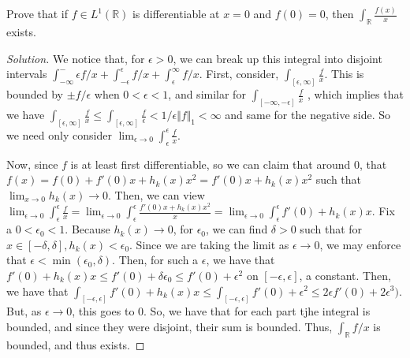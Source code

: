 \documentclass[10pt]{article}
\newenvironment{problem}[2][Problem]{\begin{trivlist}
\item[\hskip \labelsep {\bfseries #1}\hskip \labelsep {\bfseries #2.}]}{\end{trivlist}}
\begin{document}
\begin{problem}{4.4.19}
Prove that if $f \in L^1(\mathbb{R})$ is differentiable at $x = 0$ and $f(0) = 0$, then $\int_{\mathbb{R}} \frac{f(x)}{x}$ exists. 
\end{problem}
\begin{proof}[Solution]

We notice that, for $\epsilon > 0$, we can break up this integral into disjoint intervals $\int_{-\infty}^-\epsilon f/x + \int_{-\epsilon}^\epsilon f/x + \int_\epsilon^\infty f/x$. First, consider, $\int_{[\epsilon,\infty]} \frac{f}{x}$. This is bounded by $\pm f/\epsilon$ when $0 < \epsilon < 1$, and similar for $\int_{[-\infty,-\epsilon]} \frac{f}{x}$ , which implies that we have  $\int_{[\epsilon,\infty]} \frac{f}{x} \leq \int_{[\epsilon,\infty]} \frac{f}{\epsilon} < 1/\epsilon \Vert f \Vert_1 < \infty $ and same for the negative side. So we need only consider $\lim_{\epsilon \to 0} \int_\epsilon^\epsilon \frac{f}{x}$.

Now, since $f$ is at least first differentiable, so we can claim that around 0, that $f(x) = f(0) + f'(0)x + h_k(x)x^2  = f'(0)x + h_k(x)x^2$ such that $\lim_{x \to 0} h_k(x) \to 0$. Then, we can view $\lim_{\epsilon \to 0} \int_\epsilon^\epsilon \frac{f}{x} = \lim_{\epsilon \to 0} \int_\epsilon^\epsilon \frac{ f'(0)x + h_k(x)x^2}{x} =  \lim_{\epsilon \to 0} \int_\epsilon^\epsilon f'(0)+ h_k(x)x $. Fix a $0 < \epsilon_0 < 1$.  Because $h_k(x) \to 0$, for $\epsilon_0$, we can find $\delta > 0$ such that for $x \in [-\delta,\delta], h_k(x) < \epsilon_0$. Since we are taking the limit as $\epsilon \to 0$, we may enforce that $\epsilon < \min(\epsilon_0,\delta)$. Then, for such a $\epsilon$, we have that $f'(0) + h_k(x)x \leq f'(0) +  \delta \epsilon_0 \leq f'(0) + \epsilon^2 $ on $[-\epsilon,\epsilon]$, a constant. Then, we have that $\int_{[-\epsilon,\epsilon]} f'(0)+ h_k(x)x \leq  \int_{[-\epsilon,\epsilon]}  f'(0) + \epsilon^2 \leq 2\epsilon f'(0) + 2\epsilon^3)$. But, as $\epsilon \to 0$, this goes to $0$. So, we have that for each part tjhe integral is bounded, and since they were disjoint, their sum is bounded. Thus, $\int_{\mathbb{R}} f/x$ is bounded, and thus exists.

\end{proof}
\end{document}
